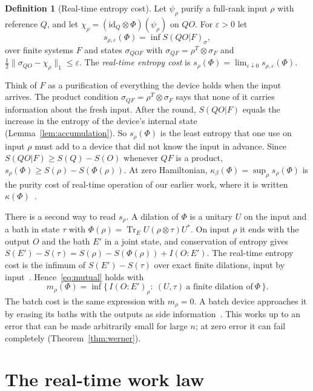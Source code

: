\documentclass[11pt]{article}
\theoremstyle{definition}
\newtheorem{definition}{Definition}
\theoremstyle{remark}
\newcommand{\Tr}{\operatorname{Tr}}
\newcommand{\Trt}{\kappa_\beta}
\begin{document}
\begin{definition}[Real-time entropy cost]\label{def:rtcost}
Let $\psi_\rho$ purify a full-rank input $\rho$ with reference $Q$, and let $\chi_\rho=(\mathrm{id}_Q\otimes\Phi)(\psi_\rho)$ on $QO$. For $\varepsilon>0$ let
\[
s_{\rho,\varepsilon}(\Phi)=\inf S(QO|F)_\sigma,
\]
over finite systems $F$ and states $\sigma_{QOF}$ with $\sigma_{QF}=\rho^{T}\otimes\sigma_F$ and $\tfrac12\|\sigma_{QO}-\chi_\rho\|_1\le\varepsilon$. The \emph{real-time entropy cost} is $s_\rho(\Phi)=\lim_{\varepsilon\downarrow0}s_{\rho,\varepsilon}(\Phi)$.
\end{definition}

Think of $F$ as a purification of everything the device holds when the input arrives. The product condition $\sigma_{QF}=\rho^T\otimes\sigma_F$ says that none of it carries information about the fresh input. After the round, $S(QO|F)$ equals the increase in the entropy of the device's internal state (Lemma~\ref{lem:accumulation}). So $s_\rho(\Phi)$ is the least entropy that one use on input $\rho$ must add to a device that did not know the input in advance. Since $S(QO|F)\ge S(Q)-S(O)$ whenever $QF$ is a product, $s_\rho(\Phi)\ge S(\rho)-S(\Phi(\rho))$. At zero Hamiltonian, $\Trt(\Phi)=\sup_\rho s_\rho(\Phi)$ is the purity cost of real-time operation of our earlier work, where it is written $\kappa(\Phi)$~\cite{Memory,ImmediateDelivery,ClosedMemory}.

There is a second way to read $s_\rho$. A dilation of $\Phi$ is a unitary $U$ on the input and a bath in state $\tau$ with $\Phi(\rho)=\Tr_E U(\rho\otimes\tau)U^*$. On input $\rho$ it ends with the output $O$ and the bath $E'$ in a joint state, and conservation of entropy gives $S(E')-S(\tau)=S(\rho)-S(\Phi(\rho))+I(O{:}E')$. The real-time entropy cost is the infimum of $S(E')-S(\tau)$ over exact finite dilations, input by input~\cite{ClosedMemory}. Hence~\eqref{eq:mutual} holds with
\[
m_\rho(\Phi)=\inf\bigl\{\,I(O{:}E')_\rho:\ (U,\tau)\ \text{a finite dilation of}\ \Phi\,\bigr\}.
\]
The batch cost is the same expression with $m_\rho=0$. A batch device approaches it by erasing its baths with the outputs as side information~\cite[Sec.~7]{FBB21}. This works up to an error that can be made arbitrarily small for large $n$; at zero error it can fail completely (Theorem~\ref{thm:werner}).

\section{The real-time work law}\label{sec:law}
\end{document}

